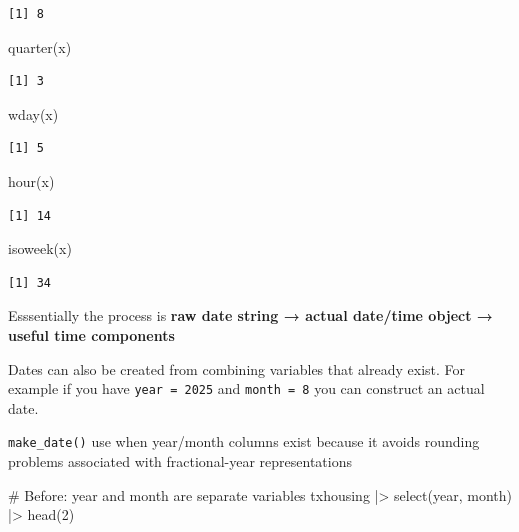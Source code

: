 \documentclass[
  letterpaper,
  DIV=11,
  numbers=noendperiod]{scrreprt}
\newenvironment{Shaded}{\begin{snugshade}}{\end{snugshade}}
\newcommand{\CommentTok}[1]{\textcolor[rgb]{0.37,0.37,0.37}{#1}}
\newcommand{\DecValTok}[1]{\textcolor[rgb]{0.68,0.00,0.00}{#1}}
\newcommand{\FunctionTok}[1]{\textcolor[rgb]{0.28,0.35,0.67}{#1}}
\newcommand{\NormalTok}[1]{\textcolor[rgb]{0.00,0.23,0.31}{#1}}
\newcommand{\SpecialCharTok}[1]{\textcolor[rgb]{0.37,0.37,0.37}{#1}}
\begin{document}
\begin{verbatim}
[1] 8
\end{verbatim}

\begin{Shaded}
\begin{Highlighting}[]
\FunctionTok{quarter}\NormalTok{(x)}
\end{Highlighting}
\end{Shaded}

\begin{verbatim}
[1] 3
\end{verbatim}

\begin{Shaded}
\begin{Highlighting}[]
\FunctionTok{wday}\NormalTok{(x)}
\end{Highlighting}
\end{Shaded}

\begin{verbatim}
[1] 5
\end{verbatim}

\begin{Shaded}
\begin{Highlighting}[]
\FunctionTok{hour}\NormalTok{(x)}
\end{Highlighting}
\end{Shaded}

\begin{verbatim}
[1] 14
\end{verbatim}

\begin{Shaded}
\begin{Highlighting}[]
\FunctionTok{isoweek}\NormalTok{(x)}
\end{Highlighting}
\end{Shaded}

\begin{verbatim}
[1] 34
\end{verbatim}

Esssentially the process is \textbf{raw date string → actual date/time
object → useful time components}

Dates can also be created from combining variables that already exist.
For example if you have \texttt{year\ =\ 2025} and \texttt{month\ =\ 8}
you can construct an actual date.

\texttt{make\_date()} use when year/month columns exist because it
avoids rounding problems associated with fractional-year representations

\begin{Shaded}
\begin{Highlighting}[]
\CommentTok{\# Before: year and month are separate variables}
\NormalTok{txhousing }\SpecialCharTok{|\textgreater{}}
    \FunctionTok{select}\NormalTok{(year, month) }\SpecialCharTok{|\textgreater{}}
    \FunctionTok{head}\NormalTok{(}\DecValTok{2}\NormalTok{)}
\end{Highlighting}
\end{Shaded}
\end{document}
